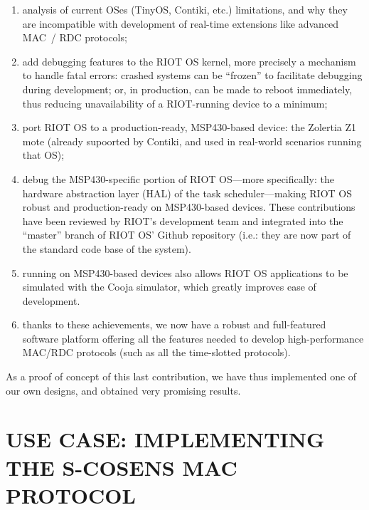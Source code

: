 \documentclass[a4paper,twoside]{article}
\begin{document}
\begin{enumerate}

\item analysis of current OSes (TinyOS, Contiki, etc.) limitations,
      and why they are incompatible with development of real-time
      extensions like advanced MAC~/ RDC protocols;

\item add debugging features to the RIOT OS kernel, more precisely
      a mechanism to handle fatal errors: crashed systems can be
      ``frozen'' to facilitate debugging during development; or,
      in production, can be made to reboot immediately, thus reducing
      unavailability of a RIOT-running device to a minimum;

\item port RIOT OS to a production-ready, MSP430-based device:
      the Zolertia Z1 mote (already supoorted by Contiki,
      and used in real-world scenarios running that OS);

\item debug the MSP430-specific portion of RIOT OS---more specifically:
      the hardware abstraction layer (HAL) of the task scheduler---making
      RIOT OS robust and production-ready on MSP430-based devices.
      These contributions have been reviewed by RIOT's development team
      and integrated into the ``master'' branch of RIOT OS' Github
      repository (i.e.: they are now part of the standard code base of
      the system).

\item running on MSP430-based devices also allows RIOT OS applications
      to be simulated with the Cooja simulator, which greatly improves
      ease of development.

\item thanks to these achievements, we now have a robust and full-featured
      software platform offering all the features needed to develop
      high-performance MAC/RDC protocols (such as all the time-slotted
      protocols).

\end{enumerate}

As a proof of concept of this last contribution, we have thus implemented one
of our own designs, and obtained very promising results.


\section{\uppercase{Use Case: implementing the S-CoSenS MAC protocol}}
\end{document}
